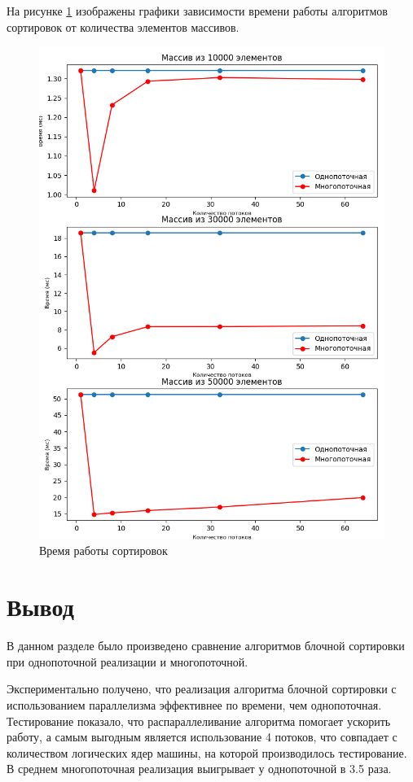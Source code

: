 На рисунке \ref{fig:graph2} изображены графики зависимости времени работы алгоритмов сортировок от количества элементов массивов. 

\begin{figure}[h!]
	\centering
	\includegraphics[width=1\linewidth]{img/Plot.png}
	\caption{Время работы сортировок}
	\label{fig:graph2}
\end{figure}

\section*{Вывод}
В данном разделе было произведено сравнение алгоритмов блочной сортировки при однопоточной реализации и многопоточной.

Экспериментально получено, что реализация алгоритма блочной сортировки с использованием параллелизма эффективнее по времени, чем однопоточная. 
Тестирование показало, что распараллеливание алгоритма помогает ускорить работу, а самым выгодным является использование 4 потоков, что совпадает с количеством логических ядер машины, на которой производилось тестирование. 
В среднем многопоточная реализация выигрывает у однопоточной в 3.5 раза. 
